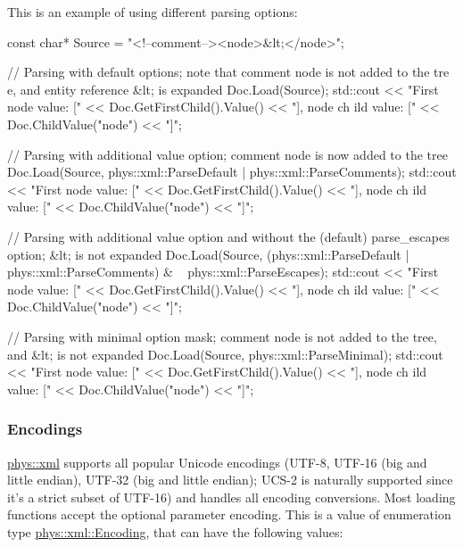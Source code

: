 This is an example of using different parsing options: 
\begin{DoxyCode}
 const char* Source = "<!--comment--><node>&lt;</node>";

  // Parsing with default options; note that comment node is not added to the tre
      e, and entity reference &lt; is expanded
 Doc.Load(Source);
 std::cout << "First node value: [" << Doc.GetFirstChild().Value() << "], node ch
      ild value: [" << Doc.ChildValue("node") << "]\n";

 // Parsing with additional value option; comment node is now added to the tree
 Doc.Load(Source, phys::xml::ParseDefault | phys::xml::ParseComments);
 std::cout << "First node value: [" << Doc.GetFirstChild().Value() << "], node ch
      ild value: [" << Doc.ChildValue("node") << "]\n";

 // Parsing with additional value option and without the (default) parse_escapes 
      option; &lt; is not expanded
 Doc.Load(Source, (phys::xml::ParseDefault | phys::xml::ParseComments) & ~
      phys::xml::ParseEscapes);
 std::cout << "First node value: [" << Doc.GetFirstChild().Value() << "], node ch
      ild value: [" << Doc.ChildValue("node") << "]\n";

 // Parsing with minimal option mask; comment node is not added to the tree, and 
      &lt; is not expanded
 Doc.Load(Source, phys::xml::ParseMinimal);
 std::cout << "First node value: [" << Doc.GetFirstChild().Value() << "], node ch
      ild value: [" << Doc.ChildValue("node") << "]\n";
\end{DoxyCode}
 \hypertarget{XMLManual_XMLLoadingEncodings}{}\subsubsection{Encodings}\label{XMLManual_XMLLoadingEncodings}
\hyperlink{namespacephys_1_1xml}{phys::xml} supports all popular Unicode encodings (UTF-\/8, UTF-\/16 (big and little endian), UTF-\/32 (big and little endian); UCS-\/2 is naturally supported since it's a strict subset of UTF-\/16) and handles all encoding conversions. Most loading functions accept the optional parameter encoding. This is a value of enumeration type \hyperlink{namespacephys_1_1xml_a420f5de782438f88160321385bea2015}{phys::xml::Encoding}, that can have the following values:
